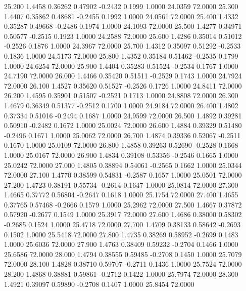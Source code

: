   25.200   1.4458   0.36262   0.47902  -0.2432   0.1999   1.0000  24.0359  72.0000
  25.300   1.4407   0.35862   0.48681  -0.2455   0.1992   1.0000  24.0561  72.0000
  25.400   1.4332   0.35287   0.49668  -0.2486   0.1974   1.0000  24.1093  72.0000
  25.500   1.4277   0.34971   0.50577  -0.2515   0.1923   1.0000  24.2588  72.0000
  25.600   1.4286   0.35014   0.51012  -0.2526   0.1876   1.0000  24.3967  72.0000
  25.700   1.4312   0.35097   0.51292  -0.2533   0.1836   1.0000  24.5173  72.0000
  25.800   1.4352   0.35184   0.51462  -0.2535   0.1799   1.0000  24.6254  72.0000
  25.900   1.4404   0.35283   0.51524  -0.2534   0.1767   1.0000  24.7190  72.0000
  26.000   1.4466   0.35420   0.51511  -0.2529   0.1743   1.0000  24.7924  72.0000
  26.100   1.4527   0.35620   0.51527  -0.2526   0.1726   1.0000  24.8411  72.0000
  26.200   1.4595   0.35901   0.51507  -0.2521   0.1713   1.0000  24.8808  72.0000
  26.300   1.4679   0.36349   0.51377  -0.2512   0.1700   1.0000  24.9184  72.0000
  26.400   1.4802   0.37334   0.51016  -0.2494   0.1687   1.0000  24.9599  72.0000
  26.500   1.4892   0.39281   0.50910  -0.2482   0.1672   1.0000  25.0024  72.0000
  26.600   1.4884   0.39329   0.51480  -0.2496   0.1671   1.0000  25.0062  72.0000
  26.700   1.4874   0.39336   0.52067  -0.2511   0.1670   1.0000  25.0109  72.0000
  26.800   1.4858   0.39263   0.52690  -0.2528   0.1668   1.0000  25.0167  72.0000
  26.900   1.4834   0.39108   0.53356  -0.2546   0.1665   1.0000  25.0242  72.0000
  27.000   1.4805   0.38894   0.54061  -0.2565   0.1662   1.0000  25.0344  72.0000
  27.100   1.4770   0.38599   0.54831  -0.2587   0.1657   1.0000  25.0501  72.0000
  27.200   1.4723   0.38191   0.55734  -0.2614   0.1647   1.0000  25.0814  72.0000
  27.300   1.4665   0.37772   0.56804  -0.2647   0.1618   1.0000  25.1754  72.0000
  27.400   1.4655   0.37765   0.57468  -0.2666   0.1579   1.0000  25.2962  72.0000
  27.500   1.4667   0.37872   0.57920  -0.2677   0.1549   1.0000  25.3917  72.0000
  27.600   1.4686   0.38000   0.58302  -0.2685   0.1524   1.0000  25.4718  72.0000
  27.700   1.4709   0.38133   0.58642  -0.2693   0.1502   1.0000  25.5418  72.0000
  27.800   1.4735   0.38269   0.58952  -0.2699   0.1483   1.0000  25.6036  72.0000
  27.900   1.4763   0.38409   0.59232  -0.2704   0.1466   1.0000  25.6586  72.0000
  28.000   1.4794   0.38555   0.59485  -0.2708   0.1450   1.0000  25.7079  72.0000
  28.100   1.4828   0.38710   0.59707  -0.2711   0.1436   1.0000  25.7524  72.0000
  28.200   1.4868   0.38881   0.59861  -0.2712   0.1422   1.0000  25.7974  72.0000
  28.300   1.4921   0.39097   0.59890  -0.2708   0.1407   1.0000  25.8454  72.0000
